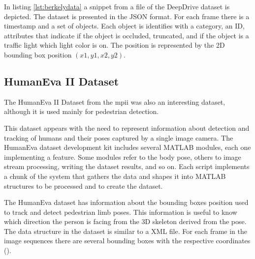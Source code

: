 In listing \ref{lst:berkelydata} a snippet from a file of the DeepDrive dataset is depicted. The dataset is presented in the JSON format. For each frame there is a timestamp and a set of objects. Each object is identifies with a category, an ID, attributes that indicate if the object is occluded, truncated, and if the object is a traffic light which light color is on. The position is represented by the 2D bounding box position $(x1,y1,x2,y2)$.

	
\subsection{HumanEva II Dataset}
The HumanEva II Dataset from the \gls{mpii} was also an interesting dataset, although it is used mainly for pedestrian detection.

This dataset appears with the need to represent information about detection and tracking of humans and their poses captured by a single image camera. The HumanEva dataset development kit includes several MATLAB modules, each one implementing a feature. Some modules refer to the body pose, others to image stream processing, writing the dataset results, and so on. Each script implements a chunk of the system that gathers the data and shapes it into MATLAB structures to be processed and to create the dataset.

The HumanEva dataset has information about the bounding boxes position used to track and detect pedestrian limb poses. This information is useful to know which direction the person is facing from the 3D skeleton derived from the pose. The data structure in the dataset is similar to a XML file. For each frame in the image sequences there are several bounding boxes with the respective coordinates (\cite{Sigal}).

\begin{figure}

\end{figure}

